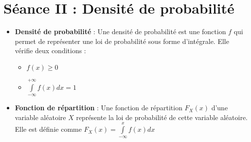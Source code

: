 \documentclass[a4paper,11pt]{report}
\begin{document}
\section{Séance II : Densité de probabilité}
\begin{itemize}
	\item \textbf{Densité de probabilité} : Une densité de probabilité est une fonction $f$ qui permet de représenter une loi de probabilité sous forme d'intégrale. Elle vérifie deux conditions :
	\begin{itemize}
		\item $f(x) \ge 0$
		\item $\int\limits_{-\infty}^{+\infty}{f(x)dx}=1$
	\end{itemize}
	\item \textbf{Fonction de répartition} : Une fonction de répartition $F_X(x)$ d'une variable aléatoire $X$ représente la loi de probabilité de cette variable aléatoire. Elle est définie comme $F_X(x)=\int\limits_{-\infty}^{x}{f(x)dx}$
\end{itemize}

\end{document}

